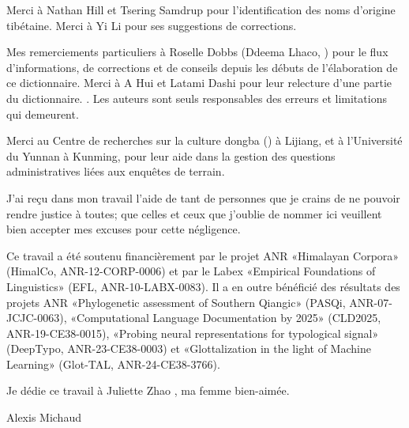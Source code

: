 Merci à Nathan Hill et Tsering Samdrup pour l'identification des noms d'origine tibétaine. Merci à Yi Li  pour ses suggestions de corrections.

Mes remerciements particuliers à Roselle Dobbs (Ddeema Lhaco, ) pour le flux d’informations, de corrections et de conseils depuis les débuts de l’élaboration de ce dictionnaire. Merci à A Hui  et Latami Dashi  pour leur relecture d’une partie du dictionnaire.  \parencite[vi]{yliniemi_descriptive_2022}. Les auteurs sont seuls responsables des erreurs et limitations qui demeurent.

Merci au Centre de recherches sur la culture dongba () à Lijiang, et à l’Université du Yunnan à Kunming, pour leur aide dans la gestion des questions administratives liées aux enquêtes de terrain.

J’ai reçu dans mon travail l’aide de tant de personnes que je crains de ne pouvoir rendre justice à toutes; que celles et ceux que j’oublie de nommer ici veuillent bien accepter mes excuses pour cette négligence.

Ce travail a été soutenu financièrement par le projet ANR «Himalayan Corpora» (HimalCo, ANR-12-CORP-0006) et par le Labex «Empirical Foundations of Linguistics» (EFL, ANR-10-LABX-0083). Il a en outre bénéficié des résultats des projets ANR «Phylogenetic assessment of Southern Qiangic» (PASQi, ANR-07-JCJC-0063), «Computational Language Documentation by 2025» (CLD2025, ANR-19-CE38-0015), «Probing neural representations for typological signal» (DeepTypo, ANR-23-CE38-0003) et «Glottalization in the light of Machine Learning» (Glot-TAL, ANR-24-CE38-3766).

Je dédie ce travail à Juliette Zhao , ma femme bien-aimée.

{\raggedleft Alexis Michaud\par}

